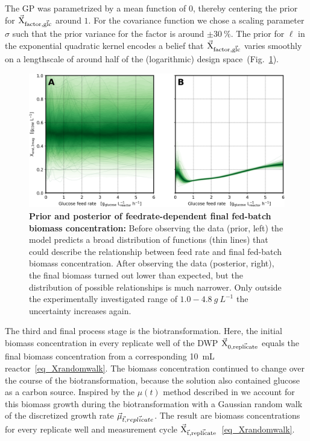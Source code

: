 \documentclass[sn-standardnature]{sn-jnl}%
\def\vec{\mathaccent "017E\relax }
\theoremstyle{thmstyleone}%
\theoremstyle{thmstyletwo}%
\theoremstyle{thmstylethree}%
\begin{document}
The GP was parametrized by a mean function of $0$, thereby centering the prior for $\mathrm{\vec{X}_{factor,\vec{glc}}}$ around $1$.
For the covariance function we chose a scaling parameter $\sigma$ such that the prior variance for the factor is around $\pm30\ \%$.
The prior for $\ell$ in the exponential quadratic kernel encodes a belief that $\mathrm{\vec{X}_{factor,\vec{glc}}}$ varies smoothly on a lengthscale of around half of the (logarithmic) design space~(Fig.~\ref{fig_gpXfactor}).

\begin{figure}[H]
    \centering
    \includegraphics[width=1.0\textwidth]{figures/Fig9.png}
    \caption{
        \textbf{Prior and posterior of feedrate-dependent final fed-batch biomass concentration:}
        Before observing the data (prior, left) the model predicts a broad distribution of functions (thin lines) that could describe the relationship between feed rate and final fed-batch biomass concentration.
        After observing the data (posterior, right), the final biomass turned out lower than expected, but the distribution of possible relationships is much narrower.
        Only outside the experimentally investigated range of $1.0-4.8\ g\ L^{-1}$ the uncertainty increases again.
    }
    \label{fig_gpXfactor}
\end{figure}

The third and final process stage is the biotransformation.
Here, the initial biomass concentration in every replicate well of the DWP $\mathrm{\vec{X}_{0,\vec{replicate}}}$ equals the final biomass concentration from a corresponding 10~mL reactor~\eqref{eq_Xrandomwalk}.
The biomass concentration continued to change over the course of the biotransformation, because the solution also contained glucose as a carbon source.
Inspired by the $\mu(t)$ method described in \cite{bletlPaper} we account for this biomass growth during the biotransformation with a Gaussian random walk of the discretized growth rate $\vec{\mu}_{\vec{t},\vec{replicate}}$.
The result are biomass concentrations for every replicate well and measurement cycle $\mathrm{\vec{X}_{\vec{t},\vec{replicate}}}$~\eqref{eq_Xrandomwalk}.
\end{document}
